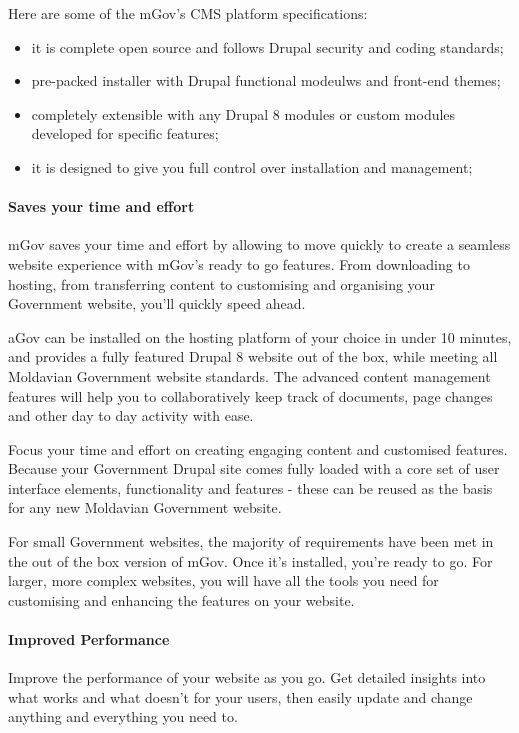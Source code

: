 Here are some of the mGov’s CMS platform specifications:

\begin{itemize}
	\item it is complete open source and follows Drupal security and coding standards;
	\item pre-packed installer with Drupal functional modeulws and front-end themes;
	\item completely extensible with any Drupal 8 modules or custom modules developed for specific features;
	\item it is designed to give you full control over installation and management;
\end{itemize}

\paragraph{Saves your time and effort}

mGov saves your time and effort by allowing to move quickly to create a seamless website experience with mGov’s ready to go features. From downloading to hosting, from transferring content to customising and organising your Government website, you’ll quickly speed ahead.

aGov can be installed on the hosting platform of your choice in under 10 minutes, and provides a fully featured Drupal 8 website out of the box, while meeting all Moldavian Government website standards. The advanced content management features will help you to collaboratively keep track of documents, page changes and other day to day activity with ease.

Focus your time and effort on creating engaging content and customised features. Because your Government Drupal site comes fully loaded with a core set of user interface elements, functionality and features - these can be reused as the basis for any new Moldavian Government website.

For small Government websites, the majority of requirements have been met in the out of the box version of mGov. Once it's installed, you're ready to go. For larger, more complex websites, you will have all the tools you need for customising and enhancing the features on your website.

\paragraph{Improved Performance}

Improve the performance of your website as you go. Get detailed insights into what works and what doesn’t for your users, then easily update and change anything and everything you need to.


